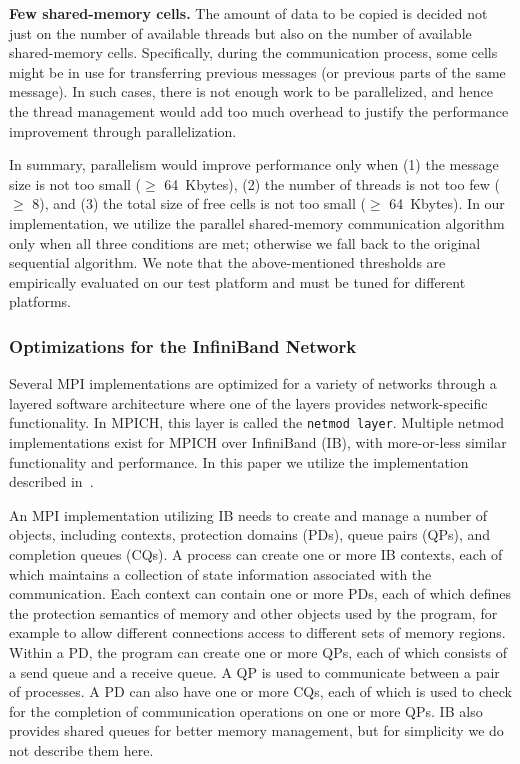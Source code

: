 \vspace{1.0ex}
\noindent\textbf{Few shared-memory cells.}  The amount of data to be
copied is decided not just on the number of available threads but also
on the number of available shared-memory cells.  Specifically, during
the communication process, some cells might be in use for transferring
previous messages (or previous parts of the same message).  In such
cases, there is not enough work to be parallelized, and hence the
thread management would add too much overhead to justify the
performance improvement through parallelization.
\vspace{1.0ex}

In summary, parallelism would improve performance only when (1) the
message size is not too small ($\ge$ 64~Kbytes), (2) the number of
threads is not too few ($\ge$ 8), and (3) the total size of free cells
is not too small ($\ge$ 64~Kbytes). In our implementation, we utilize
the parallel shared-memory communication algorithm only when all three
conditions are met; otherwise we fall back to the original sequential
algorithm.  We note that the above-mentioned thresholds are
empirically evaluated on our test platform and must be tuned for
different platforms.


\subsubsection{Optimizations for the InfiniBand Network}\label{sec:imp-netmod}

Several MPI implementations are optimized for a variety of networks
through a layered software architecture where one of the layers
provides network-specific functionality.  In MPICH, this layer is
called the \texttt{netmod layer}.  Multiple netmod implementations
exist for MPICH over InfiniBand (IB), with more-or-less similar
functionality and performance.  In this paper we utilize the
implementation described in~\cite{mpich-ibnetmod}.

An MPI implementation utilizing IB needs to create and manage a number
of objects, including contexts, protection domains (PDs), queue pairs
(QPs), and completion queues (CQs).  A process can create one or more
IB contexts, each of which maintains a collection of state information
associated with the communication.  Each context can contain one or
more PDs, each of which defines the protection semantics of memory and
other objects used by the program, for example to allow different
connections access to different sets of memory regions.  Within a PD,
the program can create one or more QPs, each of which consists of a
send queue and a receive queue.  A QP is used to communicate between a
pair of processes.  A PD can also have one or more CQs, each of which
is used to check for the completion of communication operations on one
or more QPs.  IB also provides shared queues for better memory
management, but for simplicity we do not describe them here.

